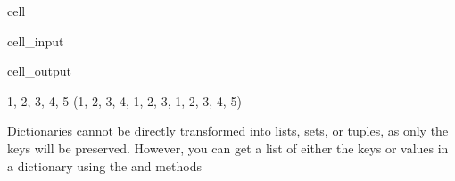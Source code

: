 \documentclass[letterpaper,10pt,english]{jupyterBook}
\begin{document}
\begin{sphinxuseclass}{cell}\begin{sphinxVerbatimInput}

\begin{sphinxuseclass}{cell_input}
\begin{sphinxVerbatim}[commandchars=\\\{\}]
  \PYG{p}{[}           \PYG{p}{]}
 
 
\end{sphinxVerbatim}

\end{sphinxuseclass}\end{sphinxVerbatimInput}
\begin{sphinxVerbatimOutput}

\begin{sphinxuseclass}{cell_output}
\begin{sphinxVerbatim}[commandchars=\\\{\}]
\PYGZob{}1, 2, 3, 4, 5\PYGZcb{}
(1, 2, 3, 4, 1, 2, 3, 1, 2, 3, 4, 5)
\end{sphinxVerbatim}

\end{sphinxuseclass}\end{sphinxVerbatimOutput}

\end{sphinxuseclass}
\sphinxAtStartPar
Dictionaries cannot be directly transformed into lists, sets, or tuples, as only the keys will be preserved. However, you can get a list of either the keys or values in a dictionary using the  and  methods
\end{document}
